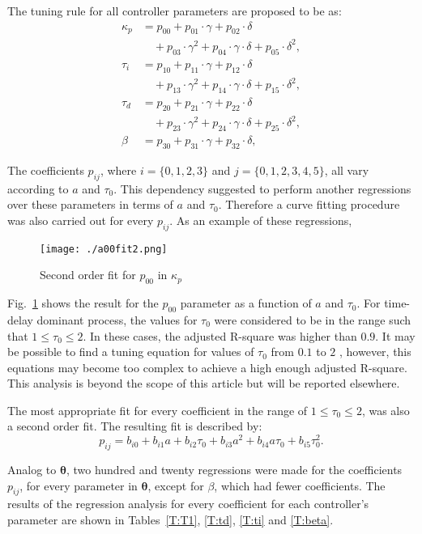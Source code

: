 The tuning rule for all controller parameters are proposed to be as:  
%
\begin{align}
\kappa_p &= p_{00}+p_{01}\cdot\gamma+p_{02}\cdot\delta\nonumber\\
&\quad + p_{03}\cdot\gamma^2+p_{04}\cdot\gamma\cdot \delta+p_{05}\cdot\delta^2,\label{E:eqkp}\\
%
\tau_i &= p_{10}+p_{11}\cdot\gamma+p_{12}\cdot\delta\nonumber\\
&\quad + p_{13}\cdot\gamma^2+p_{14}\cdot\gamma\cdot \delta+p_{15}\cdot\delta^2,\label{E:eqTi}\\
%
\tau_d &= p_{20}+p_{21}\cdot\gamma+p_{22}\cdot\delta\nonumber\\
&\quad+p_{23}\cdot\gamma^2+p_{24}\cdot\gamma\cdot \delta+p_{25}\cdot\delta^2,\label{E:eqTd}\\
%
\beta &=p_{30}+p_{31}\cdot\gamma+p_{32}\cdot\delta,\label{E:eqbeta}
\end{align}
%

The coefficients $p_{ij}$, where $i=\{0,1,2,3\}$ and $j=\{0,1,2,3,4,5\}$, all vary according to $a$ and $\tau_0$. This dependency suggested to perform another regressions over these parameters in terms of $a$ and $\tau_0$. Therefore a curve fitting procedure was also carried out for every $p_{ij}$. As an example of these regressions, 
%
\begin{figure}
	\centering
	\texttt{[image: ./a00fit2.png]}
	\caption{Second order fit for $p_{00}$ in $\kappa_p$}
	\label{F:coeff}
\end{figure}
%
Fig.~\ref{F:coeff} shows the result for the $p_{00}$ parameter as a function of $a$ and $\tau_0$.  For time-delay dominant process, the values for $\tau_0$ were considered to be in the range such that $1\leq \tau_0 \leq2$. In these cases, the adjusted R-square was higher than $0.9$. It may be possible to find a tuning equation for values of $\tau_0$ from $0.1$ to $2$ , however, this equations may become too complex to achieve a high enough adjusted R-square. This analysis is beyond the scope of this article but will be reported elsewhere.

The most appropriate fit for every coefficient in the range of $1\leq \tau_0 \leq2$, was also a second order fit. The resulting fit is described by:
%
\begin{equation}
p_{ij} = b_{i0}+b_{i1}a+b_{i2} \tau_0+b_{i3}a^2+b_{i4}a \tau_0+b_{i5}\tau_0^2 .
\label{E:coeff}
\end{equation}

Analog to $\bm{\theta}$, two hundred and twenty regressions were made for the coefficients $p_{ij}$, for every parameter in $\bm{\theta}$, except for $\beta$, which had fewer coefficients. The results of the regression analysis for every coefficient for each controller's parameter are shown in Tables~\ref{T:T1}, \ref{T:td}, \ref{T:ti} and \ref{T:beta}.

